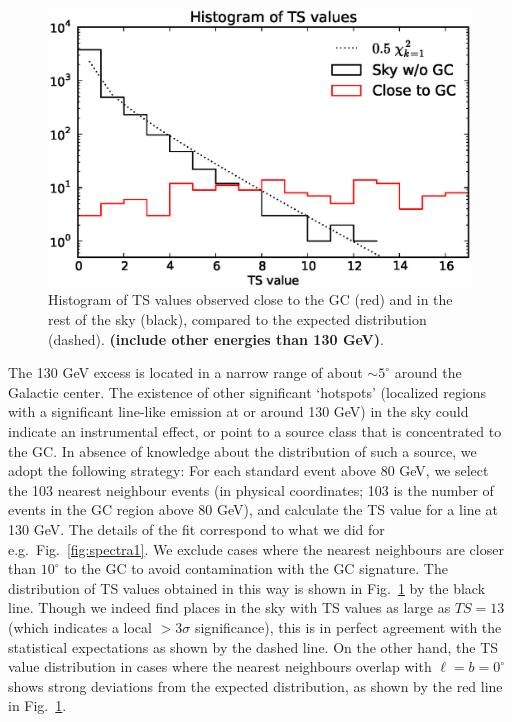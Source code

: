\documentclass[aps,twocolumn,prd,superscriptaddress,showpacs,nofootinbib,fixfloat]{revtex4}
\begin{document}
\begin{figure}
  \begin{center}
    \includegraphics[width=1.0\linewidth]{plots/hotspot_histogram.eps}
  \end{center}
  \caption{Histogram of TS values observed close to the GC
  (red) and in the rest of the sky (black), compared to the
  expected distribution (dashed). \textbf{(include other
  energies than 130 GeV)}.}
  \label{fig:hotspots}
\end{figure}

The 130 GeV excess is located in a narrow range of about
$\sim5^\circ$ around the Galactic center. The existence of
other
significant `hotspots' (localized regions with a significant
line-like emission at or around 130 GeV) in the sky could
indicate an instrumental effect, or point to a source class
that is concentrated to the GC. In absence of knowledge
about the distribution of such a source, we adopt the
following strategy: For each standard event above 80 GeV, we
select the 103 nearest neighbour events (in physical
coordinates; 103 is the number of events in the GC region
above 80 GeV), and calculate the TS value for a line at 130
GeV. The details of the fit correspond to what we did for
e.g.~Fig.~\ref{fig:spectra1}. We exclude cases where the
nearest neighbours are closer than $10^\circ$ to the GC to
avoid contamination with the GC signature. The distribution
of TS values obtained in this way is shown in
Fig.~\ref{fig:hotspots} by the black line. Though we indeed
find places in the sky with TS values as large as $TS=13$
(which indicates a local $>3\sigma$ significance), this is
in perfect agreement with the statistical expectations as
shown by the dashed line. On the other hand, the TS value
distribution in cases where the nearest neighbours overlap
with $\ell=b=0^\circ$ shows strong deviations from the
expected distribution, as shown by the red line in
Fig.~\ref{fig:hotspots}.
\end{document}
